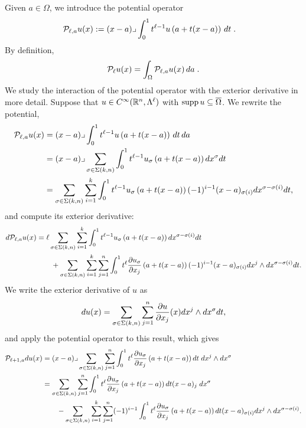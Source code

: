\documentclass[10pt,a4paper]{article}
\begin{document}
Given $a \in \Omega$, we introduce the potential operator 
\begin{align*}
    {\mathcal P}_{\ell,a} u(x) 
    &:= 
    (x-a)\lrcorner \int_{0}^{1} t^{\ell-1} u\left(a+t(x-a)\right)\,dt\;
    .
\end{align*}
By definition,
\begin{align*}
    {\mathcal P}_{\ell} u(x) 
    =
    \int_{\Omega} {\mathcal P}_{\ell,a} u(x) \,da\;
    .
\end{align*}
We study the interaction of the potential operator with the exterior derivative in more detail.
Suppose that $u \in C^{\infty}({\mathbb R}^n,\Lambda^{\ell})$ with $\operatorname{supp} u \subseteq \overline\Omega$.
We rewrite the potential,
\begin{align*}
    {\mathcal P}_{\ell,a} u(x) 
    &= 
    (x-a)\lrcorner \int_{0}^{1} t^{\ell-1} u\left(a+t(x-a)\right)\,dt\,da\;
    \\&
    = 
    (x-a)\lrcorner 
    \sum_{\sigma \in \Sigma(k,n)}
    \int_{0}^{1} 
    t^{\ell-1} u_{\sigma}\left(a+t(x-a)\right) dx^{\sigma} dt 
    \\&
    = 
    \sum_{\sigma \in \Sigma(k,n)} \sum_{i=1}^{k}
    \int_{0}^{1} 
    t^{\ell-1} u_{\sigma}\left(a+t(x-a)\right) (-1)^{i-1} (x-a)_{\sigma(i) } dx^{\sigma-\sigma(i)} dt 
    ,
\end{align*}
and compute its exterior derivative:
\begin{align*}
    d {\mathcal P}_{\ell,a} u(x) 
    &= 
    \ell
    \sum_{\sigma \in \Sigma(k,n)} \sum_{i=1}^{k}
    \int_{0}^{1} 
    t^{\ell-1} u_{\sigma}\left(a+t(x-a)\right) dx^{\sigma-\sigma(i)} dt 
    \\&\qquad
    + 
    \sum_{\sigma \in \Sigma(k,n)} \sum_{i=1}^{k} \sum_{j=1}^{n}
    \int_{0}^{1} 
    t^{\ell} \frac{ \partial u_{\sigma} }{\partial x_{j}}\left(a+t(x-a)\right) (-1)^{i-1} (x-a)_{\sigma(i) } dx^{j} \wedge dx^{\sigma-\sigma(i)} dt 
    .
\end{align*}
We write the exterior derivative of $u$ as 
\begin{align*}
    d u(x)
    =
    \sum_{\sigma \in \Sigma(k,n)} \sum_{j=1}^{n}
    \frac{ \partial u }{\partial x_{j}}(x) dx^{j} \wedge dx^{\sigma} dt 
    ,
\end{align*}
and apply the potential operator to this result, which gives 
\begin{align*}
    {\mathcal P}_{\ell+1,a} d u(x)
    &=
    (x-a)\lrcorner 
    \sum_{\sigma \in \Sigma(k,n)} \sum_{j=1}^{n}
    \int_{0}^{1} t^{\ell} \frac{ \partial u_{\sigma} }{\partial x_{j}}\left(a+t(x-a)\right) dt 
    \;dx^{j} \wedge dx^{\sigma}
    \\&
    = 
    \sum_{\sigma \in \Sigma(k,n)} \sum_{j=1}^{n}
    \int_{0}^{1} t^{\ell} \frac{ \partial u_{\sigma} }{\partial x_{j}}\left(a+t(x-a)\right) dt (x-a)_{j}
    \;dx^{\sigma}
    \\&\qquad 
    - 
    \sum_{\sigma \in \Sigma(k,n)} \sum_{i=1}^{k} \sum_{j=1}^{n}
    (-1)^{i-1}
    \int_{0}^{1} t^{\ell} \frac{ \partial u_{\sigma} }{\partial x_{j}}\left(a+t(x-a)\right) dt 
    (x-a)_{\sigma(i)} dx^{j} \wedge dx^{\sigma-\sigma(i)}
    .
\end{align*}
\end{document}

